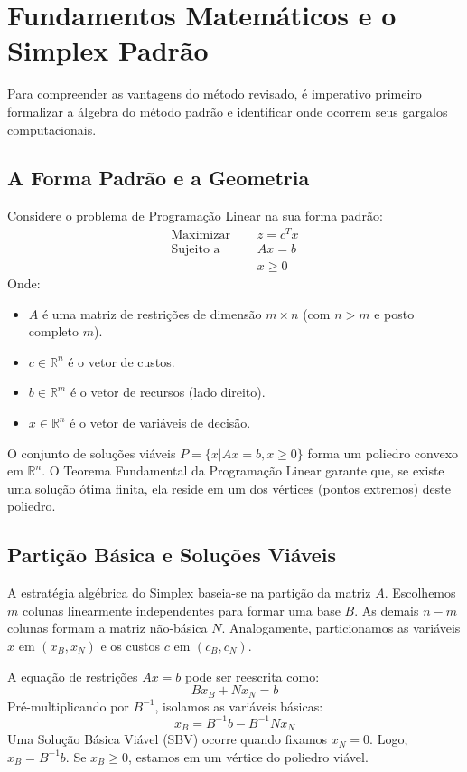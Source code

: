 \documentclass[12pt, a4paper]{article}
\begin{document}
\section{Fundamentos Matemáticos e o Simplex Padrão}
Para compreender as vantagens do método revisado, é imperativo primeiro formalizar a álgebra do método padrão e identificar onde ocorrem seus gargalos computacionais.

\subsection{A Forma Padrão e a Geometria}
Considere o problema de Programação Linear na sua forma padrão:
\begin{equation}
    \begin{aligned}
        \text{Maximizar } \quad & z = c^T x \\
        \text{Sujeito a } \quad & Ax = b \\
                                & x \ge 0
    \end{aligned}
\end{equation}
Onde:
\begin{itemize}
    \item $A$ é uma matriz de restrições de dimensão $m \times n$ (com $n > m$ e posto completo $m$).
    \item $c \in \mathbb{R}^n$ é o vetor de custos.
    \item $b \in \mathbb{R}^m$ é o vetor de recursos (lado direito).
    \item $x \in \mathbb{R}^n$ é o vetor de variáveis de decisão.
\end{itemize}

O conjunto de soluções viáveis $P = \{x | Ax=b, x \ge 0\}$ forma um poliedro convexo em $\mathbb{R}^n$. O Teorema Fundamental da Programação Linear garante que, se existe uma solução ótima finita, ela reside em um dos vértices (pontos extremos) deste poliedro.

\subsection{Partição Básica e Soluções Viáveis}
A estratégia algébrica do Simplex baseia-se na partição da matriz $A$. Escolhemos $m$ colunas linearmente independentes para formar uma base $B$. As demais $n-m$ colunas formam a matriz não-básica $N$. Analogamente, particionamos as variáveis $x$ em $(x_B, x_N)$ e os custos $c$ em $(c_B, c_N)$.

A equação de restrições $Ax=b$ pode ser reescrita como:
\begin{equation}
    Bx_B + Nx_N = b
\end{equation}
Pré-multiplicando por $B^{-1}$, isolamos as variáveis básicas:
\begin{equation}
    x_B = B^{-1}b - B^{-1}Nx_N
\end{equation}
Uma Solução Básica Viável (SBV) ocorre quando fixamos $x_N = 0$. Logo, $x_B = B^{-1}b$. Se $x_B \ge 0$, estamos em um vértice do poliedro viável.
\end{document}
